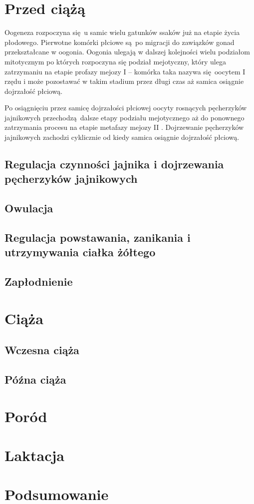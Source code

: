 \documentclass[two column, twoside, a4paper]{article}
\begin{document}
\section{Przed ciążą}

Oogeneza rozpoczyna się u samic wielu gatunków ssaków już na etapie życia płodowego. Pierwotne komórki płciowe są po migracji do zawiązków gonad przekształcane w oogonia. Oogonia ulegają w dalszej kolejności wielu podziałom mitotycznym po których rozpoczyna się podział mejotyczny, który ulega zatrzymaniu na etapie profazy mejozy I -- komórka taka nazywa się oocytem I rzędu i może pozostawać w takim stadium przez długi czas aż samica osiągnie dojrzałość płciową. \autocite{Krzymowski2005}

Po osiągnięciu przez samicę dojrzałości płciowej oocyty rosnących pęcherzyków jajnikowych przechodzą dalsze etapy podziału mejotycznego aż do ponownego zatrzymania procesu na etapie metafazy mejozy II \autocite{Sawicki2017}. Dojrzewanie pęcherzyków jajnikowych zachodzi cyklicznie od kiedy samica osiągnie dojrzałość płciową.

\subsection{Regulacja czynności jajnika i dojrzewania pęcherzyków jajnikowych}


\subsection{Owulacja}

\blindtext
\subsection{Regulacja powstawania, zanikania i utrzymywania ciałka żółtego}

\blindtext
\subsection{Zapłodnienie}

\blindtext
\section{Ciąża}

\blindtext
\subsection{Wczesna ciąża}

\blindtext
\subsection{Późna ciąża}

\blindtext
\section{Poród}

\blindtext
\section{Laktacja}

\blindtext
\section{Podsumowanie}

\blindtext

\printbibliography
\end{document}
